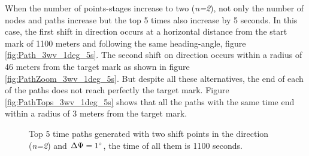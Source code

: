 When the number of points-stages increase to two (\textit{n=2}), not only the number of nodes and paths increase but the top 5 times also increase by 5 seconds. In this case, the first shift in direction occurs at a horizontal distance from the start mark of 1100 meters and following the same heading-angle, figure \ref{fig:Path_3wv_1deg_5s}. The second shift on direction occurs within a radius of 46 meters from the target mark as shown in figure \ref{fig:PathZoom_3wv_1deg_5s}. But despite all these alternatives, the end of each of the paths does not reach perfectly the target mark. Figure \ref{fig:PathTops_3wv_1deg_5s} shows that all the paths with the same time end within a radius of 3 meters from the target mark.  \par 

\begin{figure} [hbt!]
  \centering
  \hfill
  \hfill 
  \caption{Top 5 time paths generated with two shift points in the direction (\textit{n=2}) and $\Delta \Psi =1\degree$, the time of all them is 1100 seconds.}
\label{fig:Paths_3wv_1deg_5s}
\end{figure}

